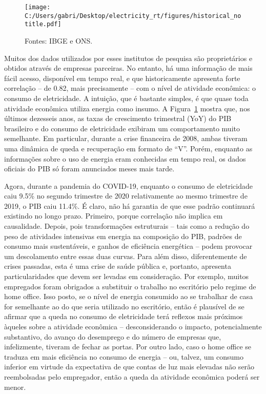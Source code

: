 \documentclass[12pt]{article}
\begin{document}
\begin{figure}[!bp]
		\label{fig:figure1}
		\texttt{[image: C:/Users/gabri/Desktop/electricity\_rt/figures/historical\_notitle.pdf]}
		\caption*{\small Fontes: IBGE e ONS.}
\end{figure}

Muitos dos dados utilizados por esses institutos de pesquisa são proprietários e obtidos através de empresas parceiras. No entanto, há uma informação de mais fácil acesso, disponível em tempo real, e que historicamente apresenta forte correlação -- de 0.82, mais precisamente -- com o nível de atividade econômica: o consumo de eletricidade. A intuição, que é bastante simples, é que quase toda atividade econômica utiliza energia como insumo. A Figura~{\ref{fig:figure1}} mostra que, nos últimos dezesseis anos, as taxas de crescimento trimestral (YoY) do PIB brasileiro e do consumo de eletricidade exibiram um comportamento muito semelhante. Em particular, durante a crise financeira de 2008, ambas tiveram uma dinâmica de queda e recuperação em formato de ``V''. Porém, enquanto as informações sobre o uso de energia eram conhecidas em tempo real, os dados oficiais do PIB só foram anunciados meses mais tarde. 

Agora, durante a pandemia do COVID-19, enquanto o consumo de eletricidade caiu 9.5\% no segundo trimestre de 2020 relativamente ao mesmo trimestre de 2019, o PIB caiu 11.4\%. É claro, não há garantia de que esse padrão continuará existindo no longo prazo. Primeiro, porque correlação não implica em causalidade. Depois, pois transformações estruturais -- tais como a redução do peso de atividades intensivas em energia na composição do PIB, padrões de consumo mais sustentáveis, e ganhos de eficiência energética -- podem provocar um descolamento entre essas duas curvas. Para além disso, diferentemente de crises passadas, esta é uma crise de saúde pública e, portanto, apresenta particularidades que devem ser levadas em consideração. Por exemplo, muitos empregados foram obrigados a substituir o trabalho no escritório pelo regime de home office. Isso posto, se o nível de energia consumido ao se trabalhar de casa for semelhante ao do que seria utilizado no escritório, então é plausível de se afirmar que a queda no consumo de eletricidade terá reflexos mais próximos àqueles sobre a atividade econômica -- desconsiderando o impacto, potencialmente substantivo, do avanço do desemprego e do número de empresas que, infelizmente, tiveram de fechar as portas. Por outro lado, caso o home office se traduza em mais eficiência no consumo de energia -- ou, talvez, um consumo inferior em virtude da expectativa de que contas de luz mais elevadas não serão reembolsadas pelo empregador, então a queda da atividade econômica poderá ser menor.
\end{document}
